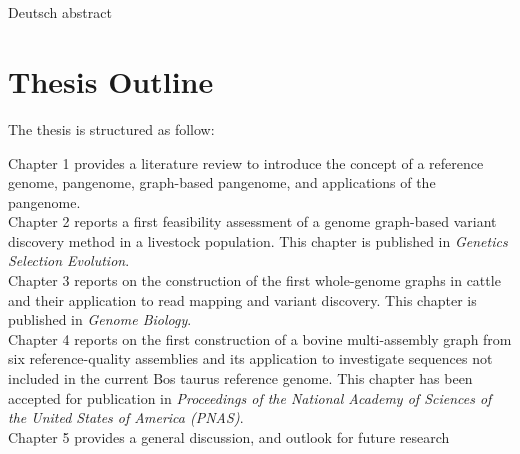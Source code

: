 \documentclass[11 pt, a4paper, notitlepage, twoside]{report}
\begin{document}
\newpage

\thispagestyle{plain}
{}
\section*{}

Deutsch abstract

\newpage

{}
\section*{\LARGE{Thesis Outline}}
\thispagestyle{plain}

The thesis is structured as follow:

Chapter 1 provides a literature review to introduce the concept of a reference genome, pangenome, graph-based pangenome, and applications of the pangenome. \\


Chapter 2 reports a first feasibility assessment of a genome graph-based variant discovery method in a livestock population. This chapter is published in \emph{Genetics Selection Evolution}. \\ 


Chapter 3 reports on the construction of the first  whole-genome graphs in cattle and their application to read mapping and variant discovery. This chapter is published in \emph{Genome Biology}. \\


Chapter 4 reports on the first construction of a bovine multi-assembly graph from six reference-quality assemblies and its application to investigate sequences not included in the current Bos taurus reference genome. This chapter has been accepted for publication in \emph{Proceedings of the National Academy of Sciences of the United States of America (PNAS)}. \\


Chapter 5 provides a general discussion, and outlook for future research


\iftwoside
\cleardoublepage
\newpage
\fi

\newpage







\onehalfspacing


\end{document}
